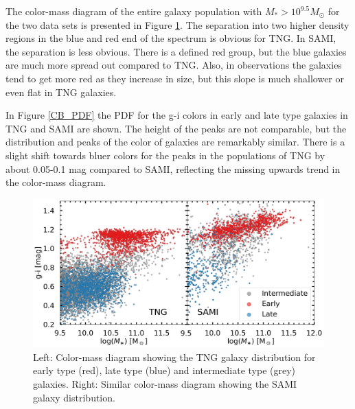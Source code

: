 The color-mass diagram of the entire galaxy population with $M_\ast > 10^{9.5}M_{\odot}$ for the two data sets is presented in Figure \ref{CB}. The separation into two higher density regions in the blue and red end of the spectrum is obvious for TNG. In SAMI, the separation is less obvious. There is a defined red group, but the blue galaxies are much more spread out compared to TNG. Also, in observations the galaxies tend to get more red as they increase in size, but this slope is much shallower or even flat in TNG galaxies.

In Figure \ref{CB_PDF} the PDF for the g-i colors in early and late type galaxies in TNG and SAMI are shown. The height of the peaks are not comparable, but the distribution and peaks of the color of galaxies are remarkably similar. There is a slight shift towards bluer colors for the peaks in the populations of TNG by about 0.05-0.1 mag compared to SAMI, reflecting the missing upwards trend in the color-mass diagram. 


\begin{figure}
    \centering
    \includegraphics[width=\textwidth]{images/CB.png}
    \caption{Left: Color-mass diagram showing the TNG galaxy distribution for early type (red), late type (blue) and intermediate type (grey) galaxies. Right: Similar color-mass diagram showing the SAMI galaxy distribution.}
    \label{CB}
\end{figure}

